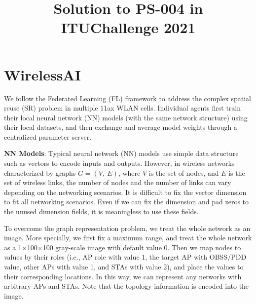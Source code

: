 \documentclass[10pt, journal, letterpaper]{IEEEtran}
\begin{document}
\title{Solution to PS-004 in ITUChallenge 2021\\
}


\author{
}


\maketitle

\section{WirelessAI}

We follow the Federated Learning (FL) framework to address the complex spatial reuse (SR) problem in multiple 11ax WLAN cells. Individual agents first train their local neural network (NN) models (with the same network structure) using their local datasets, and then exchange and average model weights through a centralized parameter server. 

{\bf NN Models}: Typical neural network (NN) models use simple data structure such as vectors to encode inputs and outputs. However, in wireless networks characterized by graphs $G=(V,~E)$, where $V$ is the set of nodes, and $E$ is the set of wireless links, the number of nodes and the number of links can vary depending on the networking scenarios. It is difficult to fix the vector dimension to fit all networking scenarios. Even if we can fix the dimension and pad zeros to the unused dimension fields, it is meaningless to use these fields.

To overcome the graph representation problem, we treat the whole network as an image. More specially, we first fix a maximum range, and treat the whole network as a 1$\times$100$\times$100 gray-scale image with default value 0. Then we map nodes to values by their roles (i.e., AP role with value 1, the target AP with OBSS/PDD value, other APs with value 1, and STAs with value 2), and place the values to their corresponding locations. In this way, we can represent any networks with arbitrary APs and STAs. Note that the topology information is encoded into the image.
\end{document}
